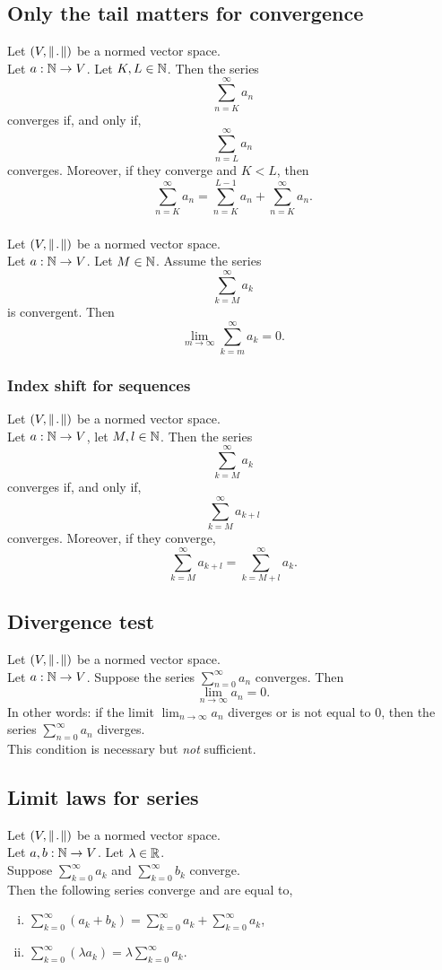 \subsection{Only the tail matters for convergence}
\uprop Let $(V, \norm)$ be a normed vector space.\\
Let $a : \mathbb{N} \to V$. Let $K,L \in \mathbb{N}$. Then the series
\[
    \sum_{n=K}^{\infty} a_n
\]
converges if, and only if,
\[
    \sum_{n=L}^{\infty} a_n
\]
converges. Moreover, if they converge and $K < L$, then
\[
    \sum_{n=K}^{\infty} a_n = \sum_{n=K}^{L-1} a_n + \sum_{n=K}^{\infty} a_n.
\]

\subsubsection*{}
\uprop Let $(V, \norm)$ be a normed vector space.\\
Let $a : \mathbb{N} \to V$. Let $M \in \mathbb{N}$. Assume the series
\[
    \sum_{k=M}^{\infty} a_k
\]
is convergent. Then
\[
    \lim_{m \to \infty} \sum_{k=m}^{\infty} a_k = 0.
\]

\subsubsection*{Index shift for sequences}
Let $(V, \norm)$ be a normed vector space.\\
Let $a : \mathbb{N} \to V$, let $M, l \in \mathbb{N}$. Then the series
\[
    \sum_{k=M}^{\infty} a_k
\]
converges if, and only if,
\[
    \sum_{k=M}^{\infty} a_{k+l}
\]
converges. Moreover, if they converge,
\[
    \sum_{k=M}^{\infty} a_{k+l} = \sum_{k=M+l}^{\infty} a_k.
\]


\subsection{Divergence test}
\uthm Let $(V, \norm)$ be a normed vector space.\\
Let $a : \mathbb{N} \to V$. Suppose the series $\sum_{n=0}^{\infty} a_n$ converges.
Then
\[
    \lim_{n \to \infty} a_n = 0.
\]
In other words: if the limit $\lim_{n \to \infty} a_n$ diverges or is not
equal to $0$, then the series $\sum_{n=0}^{\infty} a_n$ diverges.\\
\warning This condition is necessary but \emph{not} sufficient.


\subsection{Limit laws for series}
\uthm Let $(V, \norm)$ be a normed vector space.\\
Let $a,b : \mathbb{N} \to V$. Let $\lambda \in \mathbb{R}$.\\
Suppose $\sum_{k=0}^{\infty} a_k$ and $\sum_{k=0}^{\infty} b_k$ converge.\\
Then the following series converge and are equal to,
\begin{enumerate}[(i)]
    \item $\sum_{k=0}^{\infty} (a_k + b_k) = \sum_{k=0}^{\infty} a_k + \sum_{k=0}^{\infty} a_k$,
    \item $\sum_{k=0}^{\infty} (\lambda a_k) = \lambda \sum_{k=0}^{\infty} a_k$.
\end{enumerate}